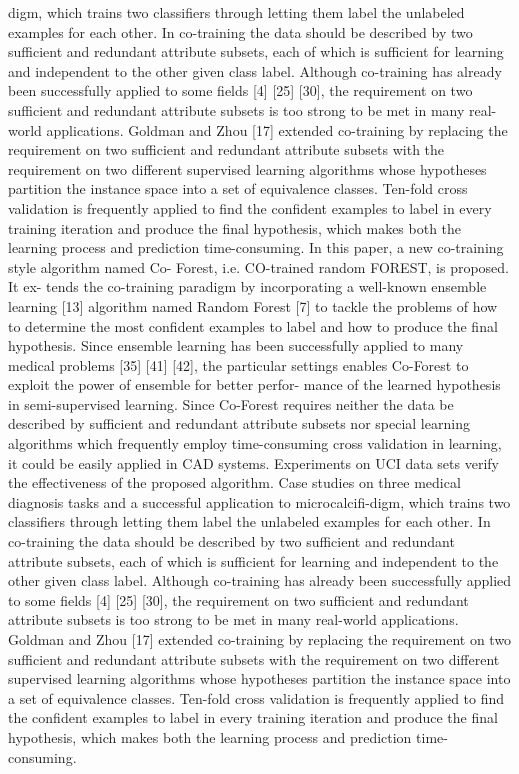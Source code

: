 \documentclass[journal]{IEEEtran}
\begin{document}
digm, which trains two classifiers through letting them label the unlabeled examples for each other. In co-training the data should be described by two sufficient and redundant attribute subsets, each of which is sufficient for learning and independent to the other given class label.
Although co-training has already been successfully applied to some fields [4] [25] [30], the requirement on two sufficient and redundant attribute subsets is too strong to be met in many real-world applications. Goldman and Zhou [17] extended co-training by replacing the requirement on two sufficient and redundant attribute subsets with the requirement on two different supervised learning algorithms whose hypotheses partition the instance space into a set of equivalence classes. Ten-fold cross validation is frequently applied to find the confident examples to label in every training iteration and produce the final hypothesis, which makes both the learning process and prediction time-consuming.
In this paper, a new co-training style algorithm named Co- Forest, i.e. CO-trained random FOREST, is proposed. It ex- tends the co-training paradigm by incorporating a well-known ensemble learning [13] algorithm named Random Forest [7] to tackle the problems of how to determine the most confident examples to label and how to produce the final hypothesis. Since ensemble learning has been successfully applied to many medical problems [35] [41] [42], the particular settings enables Co-Forest to exploit the power of ensemble for better perfor- mance of the learned hypothesis in semi-supervised learning. Since Co-Forest requires neither the data be described by sufficient and redundant attribute subsets nor special learning algorithms which frequently employ time-consuming cross validation in learning, it could be easily applied in CAD systems. Experiments on UCI data sets verify the effectiveness of the proposed algorithm. Case studies on three medical diagnosis tasks and a successful application to microcalcifi-digm, which trains two classifiers through letting them label the unlabeled examples for each other. In co-training the data should be described by two sufficient and redundant attribute subsets, each of which is sufficient for learning and independent to the other given class label.
Although co-training has already been successfully applied to some fields [4] [25] [30], the requirement on two sufficient and redundant attribute subsets is too strong to be met in many real-world applications. Goldman and Zhou [17] extended co-training by replacing the requirement on two sufficient and redundant attribute subsets with the requirement on two different supervised learning algorithms whose hypotheses partition the instance space into a set of equivalence classes. Ten-fold cross validation is frequently applied to find the confident examples to label in every training iteration and produce the final hypothesis, which makes both the learning process and prediction time-consuming.
\end{document}
